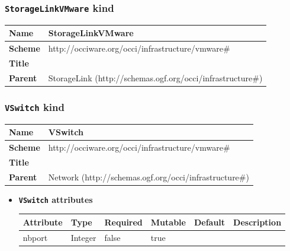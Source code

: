 \subsubsection{\texttt{StorageLinkVMware} kind}
\begin{center}
\begin{tabular}{|l|l|}
  \hline
  \textbf{Name} & StorageLinkVMware \\
  \hline  
  \textbf{Scheme} & http://occiware.org/occi/infrastructure/vmware\# \\
  \hline
  \textbf{Title} &  \\
  \hline
  \textbf{Parent} & StorageLink (http://schemas.ogf.org/occi/infrastructure\#) \\
  \hline
\end{tabular}
\end{center}



\subsubsection{\texttt{VSwitch} kind}
\begin{center}
\begin{tabular}{|l|l|}
  \hline
  \textbf{Name} & VSwitch \\
  \hline  
  \textbf{Scheme} & http://occiware.org/occi/infrastructure/vmware\# \\
  \hline
  \textbf{Title} &  \\
  \hline
  \textbf{Parent} & Network (http://schemas.ogf.org/occi/infrastructure\#) \\
  \hline
\end{tabular}
\end{center}
\begin{itemize}
\item \textbf{\texttt{VSwitch} attributes}

\begin{tabularx}{\textwidth}{|l|l|p{1.4cm}|p{1.3cm}|l|X|}
  \hline
  \textbf{Attribute} & \textbf{Type} & \textbf{Required} & \textbf{Mutable} & \textbf{Default} & \textbf{Description} \\
  \hline  
  nbport & Integer & false & true &  &  \\
  \hline
\end{tabularx}
\end{itemize}



